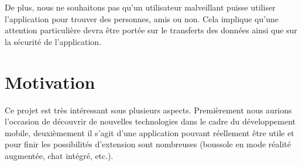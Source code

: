 \documentclass[french]{article}
\begin{document}
			De plus, nous ne souhaitons pas qu'un utilisateur malveillant puisse utiliser l'application pour trouver des personnes, amis ou non. Cela implique qu'une attention particulière devra être portée sur le transferts des données ainsi que sur la sécurité de l'application.
	
	\section{Motivation}
		Ce projet est très intéressant sous plusieurs aspects. Premièrement nous aurions l'occasion de découvrir de nouvelles technologies dans le cadre du développement mobile, deuxièmement il s'agit d'une application pouvant réellement être utile et pour finir les possibilités d'extension sont nombreuses (boussole en mode réalité augmentée, chat intégré, etc.).
	
\end{document}
